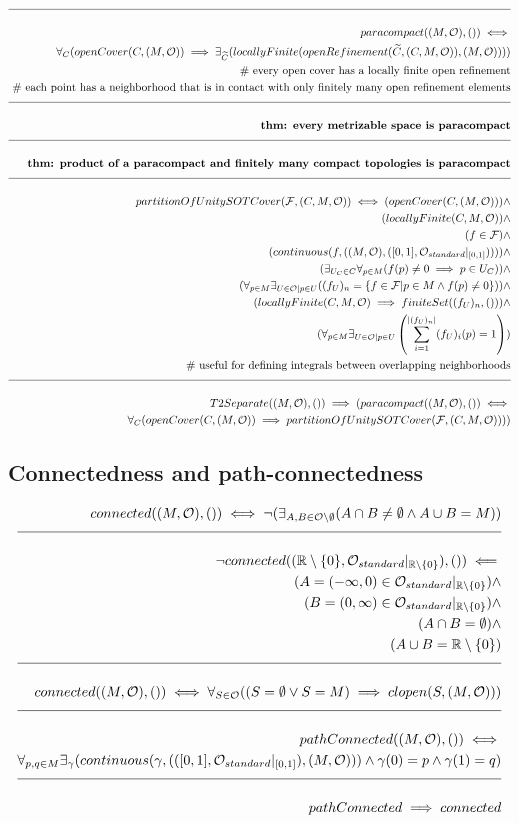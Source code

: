 \documentclass[a4paper]{article}
\newcommand{\eqComment}[1]{\text{  \# #1}}
\newcommand{\n}{\\[1.5ex] \hline \nonumber \\[0ex]}
\newcommand{\m}{\nonumber \\}
\begin{document}
\begin{tcolorbox}
\begin{align}
\n paracompact((M, \mathcal{O}), ()) \iff 
\m \forall_{C} (openCover(C, (M, \mathcal{O})) \implies \exists_{\widetilde{C}} (locallyFinite(openRefinement(\widetilde{C}, (C, M, \mathcal{O})), (M, \mathcal{O}))))
\m \eqComment{every open cover has a locally finite open refinement}
\m \eqComment{each point has a neighborhood that is in contact with only finitely many open refinement elements}
\n \textbf{thm: every metrizable space is paracompact}
\n \textbf{thm: product of a paracompact and finitely many compact topologies is paracompact}
\n partitionOfUnitySOTCover(\mathcal{F}, (C, M, \mathcal{O})) \iff (openCover(C, (M, \mathcal{O}))) \land
\m (locallyFinite(C, M, \mathcal{O})) \land
\m (f \in \mathcal{F}) \land
\m (continuous(f, ((M, \mathcal{O}), ([0, 1], \mathcal{O}_{standard}|_{[0 ,1]})))) \land
\m (\exists_{U_C \in C} \forall_{p \in M} (f(p) \neq 0 \implies p \in U_C)) \land
\m (\forall_{p \in M} \exists_{U \in \mathcal{O}| p \in U} ((f_U)_n = \{f \in \mathcal{F}| p \in M \land f(p) \neq 0\})) \land
\m (locallyFinite(C, M, \mathcal{O}) \implies finiteSet((f_U)_n, ())) \land
\m (\forall_{p \in M} \exists_{U \in \mathcal{O}| p \in U} \left(\sum_{i = 1}^{|(f_U)_n|} (f_U)_i(p) = 1 \right))
\m \eqComment{useful for defining integrals between overlapping neighborhoods}
\n T2Separate((M, \mathcal{O}), ()) \implies (paracompact((M, \mathcal{O}), ()) \iff 
\m \forall_{C} (openCover(C, (M, \mathcal{O})) \implies partitionOfUnitySOTCover(\mathcal{F}, (C, M, \mathcal{O}))))
\end {align}
\end{tcolorbox}

\subsection{Connectedness and path-connectedness}
\begin{tcolorbox}
\begin{align}
   connected((M, \mathcal{O}), ()) \iff \lnot (\exists_{A, B \in \mathcal{O} \setminus \emptyset} (A \cap B \neq \emptyset \land A \cup B = M))
\n \lnot connected((\mathbb{R} \setminus \{0\}, \mathcal{O}_{standard}|_{\mathbb{R} \setminus \{0\}}), ()) \impliedby
\m (A = (-\infty, 0) \in \mathcal{O}_{standard}|_{\mathbb{R} \setminus \{0\}}) \land 
\m (B = (0, \infty) \in \mathcal{O}_{standard}|_{\mathbb{R} \setminus \{0\}}) \land
\m (A \cap B = \emptyset) \land
\m (A \cup B = \mathbb{R} \setminus \{0\})
\n connected((M, \mathcal{O}), ()) \iff \forall_{S \in \mathcal{O}} ((S = \emptyset \lor S = M) \implies clopen(S, (M, \mathcal{O})))
\n pathConnected((M, \mathcal{O}), ()) \iff 
\m \forall_{p, q \in M} \exists_{\gamma} (continuous(\gamma, (([0, 1], \mathcal{O}_{standard}|_{[0 ,1]}), (M, \mathcal{O}))) \land \gamma(0) = p \land \gamma(1) = q)
\n pathConnected \implies connected
\end {align}
\end{tcolorbox}
\end{document}
